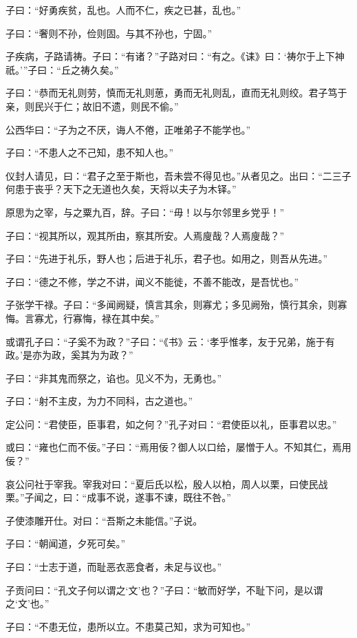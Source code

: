 \documentclass[a5paper]{ctexbook}
\begin{document}
    子曰：“好勇疾贫，乱也。人而不仁，疾之已甚，乱也。”

    子曰：“奢则不孙，俭则固。与其不孙也，宁固。”

    子疾病，子路请祷。子曰：“有诸？”子路对曰：“有之。《诔》曰：‘祷尔于上下神祇。’”子曰：“丘之祷久矣。”

    子曰：“恭而无礼则劳，慎而无礼则葸，勇而无礼则乱，直而无礼则绞。君子笃于亲，则民兴于仁；故旧不遗，则民不偷。”
    
    公西华曰：“子为之不厌，诲人不倦，正唯弟子不能学也。”

    子曰：“不患人之不己知，患不知人也。”

    仪封人请见，曰：“君子之至于斯也，吾未尝不得见也。”从者见之。出曰：“二三子何患于丧乎？天下之无道也久矣，天将以夫子为木铎。”

    原思为之宰，与之粟九百，辞。子曰：“毋！以与尔邻里乡党乎！”

    子曰：“视其所以，观其所由，察其所安。人焉廋哉？人焉廋哉？”

    子曰：“先进于礼乐，野人也；后进于礼乐，君子也。如用之，则吾从先进。”

    子曰：“德之不修，学之不讲，闻义不能徙，不善不能改，是吾忧也。”

    子张学干禄。子曰：“多闻阙疑，慎言其余，则寡尤；多见阙殆，慎行其余，则寡悔。言寡尤，行寡悔，禄在其中矣。”

    或谓孔子曰：“子奚不为政？”子曰：“《书》云：‘孝乎惟孝，友于兄弟，施于有政。’是亦为政，奚其为为政？”

    子曰：“非其鬼而祭之，谄也。见义不为，无勇也。”

    子曰：“射不主皮，为力不同科，古之道也。”

    

    定公问：“君使臣，臣事君，如之何？”孔子对曰：“君使臣以礼，臣事君以忠。”

    或曰：“雍也仁而不佞。”子曰：“焉用佞？御人以口给，屡憎于人。不知其仁，焉用佞？”

    哀公问社于宰我。宰我对曰：“夏后氏以松，殷人以柏，周人以栗，曰使民战栗。”子闻之，曰：“成事不说，遂事不谏，既往不咎。”

    子使漆雕开仕。对曰：“吾斯之未能信。”子说。
    
    子曰：“朝闻道，夕死可矣。”
    
    子曰：“士志于道，而耻恶衣恶食者，未足与议也。”

    子贡问曰：“孔文子何以谓之‘文’也？”子曰：“敏而好学，不耻下问，是以谓之‘文’也。”

    子曰：“不患无位，患所以立。不患莫己知，求为可知也。”
\end{document}
